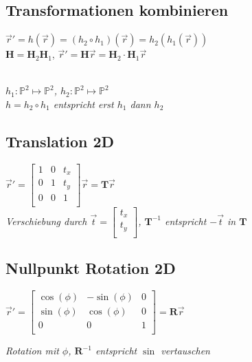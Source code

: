 \subsection{Transformationen kombinieren}

$\vec{r} ' = h(\vec{r}) = (h_2 \circ h_1)(\vec{r}) = h_2(h_1(\vec{r}))$\\

$\mathbf{H} = \mathbf{H}_2\mathbf{H}_1$,
$\vec{r} ' = \mathbf{H}\vec{r} = \mathbf{H}_2 \cdot \mathbf{H}_1\vec{r}$

\textit{\\
    $h_1: \mathbb{P}^2 \mapsto \mathbb{P}^2$,
    $h_2: \mathbb{P}^2 \mapsto \mathbb{P}^2$ \\
    $h = h_2 \circ h_1$ entspricht erst $h_1$ dann $h_2$
}

\subsection{Translation 2D}

$\vec{r} ' = \left[\begin{array}{cc|c}
    1 & 0 & t_x \\
    0 & 1 & t_y \\
    \hline
    0 & 0 & 1 \\
\end{array}\right]
\vec{r} = \mathbf{T} \vec{r}$ \\

\textit{Verschiebung durch $\vec{t} = \begin{bmatrix}
    t_x \\
    t_y \\
\end{bmatrix}$, $\mathbf{T}^{-1}$ entspricht $-\vec{t}$ in $\mathbf{T}$}

\subsection{Nullpunkt Rotation 2D}

$\vec{r}' = \left[\begin{array}{cc|c}
    \cos(\phi) & -\sin(\phi) & 0 \\
    \sin(\phi) & \cos(\phi) & 0 \\
    \hline
    0 & 0 & 1 \\
\end{array}\right] = \mathbf{R} \vec{r}$

\textit{Rotation mit $\phi$, $\mathbf{R}^{-1}$
entspricht $\sin$ vertauschen}

